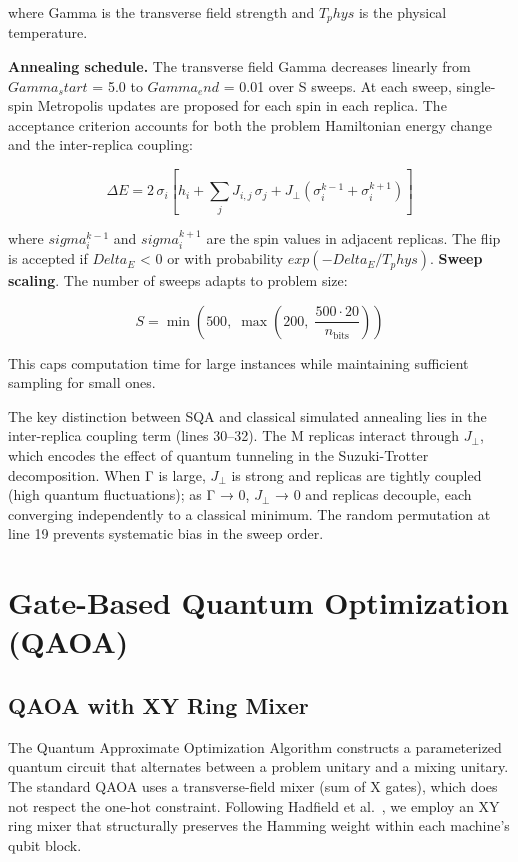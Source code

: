 where Gamma is the transverse field strength and $T_phys$ is the physical temperature.

\textbf{Annealing schedule.} The transverse field Gamma decreases linearly from $Gamma_start$ = 5.0 to $Gamma_end$ = 0.01 over S sweeps. At each sweep, single-spin Metropolis updates are proposed for each spin in each replica. The acceptance criterion accounts for both the problem Hamiltonian energy change and the inter-replica coupling:

\begin{equation}
\Delta E = 2 \, \sigma_i \left[
h_i + \sum_{j} J_{i,j} \, \sigma_j + J_{\perp} \left( \sigma_i^{k-1} + \sigma_i^{k+1} \right)
\right]
\end{equation}

where $sigma_i^{k-1}$ and $sigma_i^{k+1}$ are the spin values in adjacent replicas. The flip is accepted if $Delta_E$ < 0 or with probability $exp(-Delta_E / T_phys)$. \textbf{Sweep scaling}. The number of sweeps adapts to problem size:

\begin{equation}
S = \min\!\left(500,\; \max\!\left(200,\; \frac{500 \cdot 20}{n_{\text{bits}}}\right)\right)
\end{equation}

This caps computation time for large instances while maintaining sufficient sampling for small ones.

The key distinction between SQA and classical simulated annealing lies in the inter-replica coupling term (lines 30–32). The M replicas interact through $J_⊥$, which encodes the effect of quantum tunneling in the Suzuki-Trotter decomposition. When Γ is large, $J_⊥$ is strong and replicas are tightly coupled (high quantum fluctuations); as Γ → 0, $J_⊥$ → 0 and replicas decouple, each converging independently to a classical minimum. The random permutation at line 19 prevents systematic bias in the sweep order.

\section{Gate-Based Quantum Optimization (QAOA)}
\subsection{QAOA with XY Ring Mixer}
The Quantum Approximate Optimization Algorithm \cite{Farhi2014} constructs a parameterized quantum circuit that alternates between a problem unitary and a mixing unitary. The standard QAOA uses a transverse-field mixer (sum of X gates), which does not respect the one-hot constraint. Following Hadfield et al.\ \cite{Hadfield2019}, we employ an XY ring mixer that structurally preserves the Hamming weight within each machine's qubit block.

